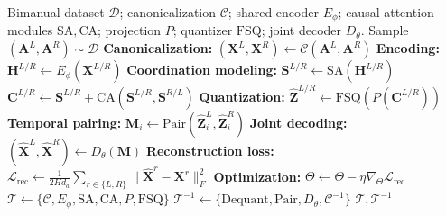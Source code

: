 \begin{algorithm}[h]
\caption{BiCAT Tokenizer Training}
\label{alg:bicat_training}
\footnotesize
\begin{algorithmic}[1]
\Require Bimanual dataset $\mathcal{D}$;
canonicalization $\mathcal{C}$;
shared encoder $E_{\phi}$;
causal attention modules $\mathrm{SA},\mathrm{CA}$;
projection $P$; quantizer $\mathrm{FSQ}$;
joint decoder $D_{\theta}$.
    \State Sample $(\mathbf{A}^{L},\mathbf{A}^{R})
    \sim \mathcal{D}$
    \State \textbf{Canonicalization:}
    $(\mathbf{X}^{L},\mathbf{X}^{R})
    \gets \mathcal{C}(\mathbf{A}^{L},\mathbf{A}^{R})$
    \State \textbf{Encoding:}
    $\mathbf{H}^{L/R}
    \gets E_{\phi}(\mathbf{X}^{L/R})$
    \State \textbf{Coordination modeling:}
    $\mathbf{S}^{L/R}
    \gets \mathrm{SA}(\mathbf{H}^{L/R})$
    \Statex \hspace{\algorithmicindent}
    $\mathbf{C}^{L/R}
    \gets \mathbf{S}^{L/R}
    + \mathrm{CA}(\mathbf{S}^{L/R},
    \mathbf{S}^{R/L})$
    \State \textbf{Quantization:}
    $\hat{\mathbf{Z}}^{L/R}
    \gets \mathrm{FSQ}(P(\mathbf{C}^{L/R}))$
    \State \textbf{Temporal pairing:}
    $\mathbf{M}_i
    \gets \mathrm{Pair}(
    \hat{\mathbf{Z}}_i^{L},
    \hat{\mathbf{Z}}_i^{R})$
    \State \textbf{Joint decoding:}
    $(\hat{\mathbf{X}}^{L},\hat{\mathbf{X}}^{R})
    \gets D_{\theta}(\mathbf{M})$
    \State \textbf{Reconstruction loss:}
    $\mathcal{L}_{\mathrm{rec}}
    \gets \frac{1}{2Hd_a}
    \sum_{r\in\{L,R\}}
    \|\hat{\mathbf{X}}^{r}
    -\mathbf{X}^{r}\|_F^2$
    \State \textbf{Optimization:}
    $\Theta \gets \Theta
    -\eta\nabla_{\Theta}\mathcal{L}_{\mathrm{rec}}$
\EndWhile
\State $\mathcal{T}
\gets \{\mathcal{C},E_{\phi},
\mathrm{SA},\mathrm{CA},P,\mathrm{FSQ}\}$
\State $\mathcal{T}^{-1}
\gets \{\mathrm{Dequant},\mathrm{Pair},
D_{\theta},\mathcal{C}^{-1}\}$
\State \Return $\mathcal{T},\mathcal{T}^{-1}$
\end{algorithmic}
\end{algorithm}

